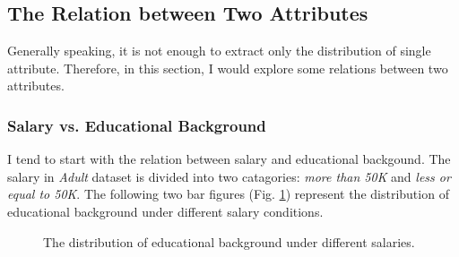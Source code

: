 \documentclass[12pt,a4paper]{article}
\theoremstyle{definition}
\begin{document}
\subsection{The Relation between Two Attributes}
\label{sec::relation}
Generally speaking, it is not enough to extract only the distribution of single attribute. Therefore, in this section, I would explore some relations between two attributes.

\subsubsection{Salary vs. Educational Background}
\label{sec::salary_vs_edu}
I tend to start with the relation between salary and educational backgound. The salary in \textit{Adult} dataset is divided into two catagories: \textit{more than 50K} and \textit{less or equal to 50K}. The following two bar figures (Fig. \ref{fig::single_salary}) represent the distribution of educational background under different salary conditions.

\begin{figure}[H]
	\centering
	\caption{The distribution of educational background under different salaries.}
	\label{fig::single_salary}
\end{figure}
\end{document}
